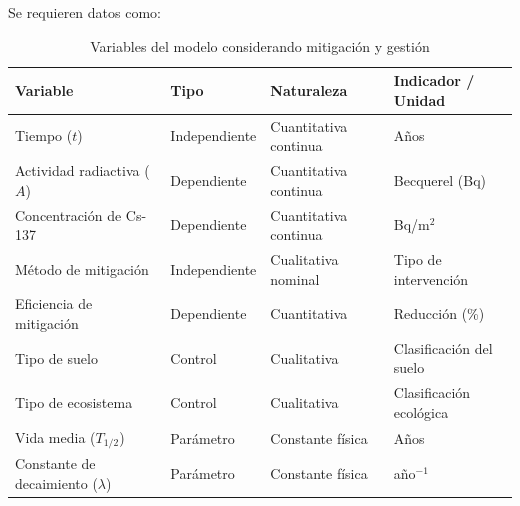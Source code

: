 

Se requieren datos como:

\begin{table}[!t]
\renewcommand{\arraystretch}{1.2}
\caption{Variables del modelo considerando mitigación y gestión}
\label{tab:variables}
\centering
\footnotesize
\begin{tabular}{|p{1.8cm}|p{1.6cm}|p{2.2cm}|p{2.6cm}|}
\hline
\textbf{Variable} & \textbf{Tipo} & \textbf{Naturaleza} & \textbf{Indicador / Unidad} \\
\hline

Tiempo ($t$) & Independiente & Cuantitativa continua & Años \\
\hline

Actividad radiactiva ($A$) & Dependiente & Cuantitativa continua & Becquerel (Bq) \\
\hline

Concentración de Cs-137 & Dependiente & Cuantitativa continua & Bq/m$^2$ \\
\hline

Método de mitigación & Independiente & Cualitativa nominal & Tipo de intervención \\
\hline

Eficiencia de mitigación & Dependiente & Cuantitativa & Reducción (\%) \\
\hline

Tipo de suelo & Control & Cualitativa & Clasificación del suelo \\
\hline

Tipo de ecosistema & Control & Cualitativa & Clasificación ecológica \\
\hline

Vida media ($T_{1/2}$) & Parámetro & Constante física & Años \\
\hline

Constante de decaimiento ($\lambda$) & Parámetro & Constante física & año$^{-1}$ \\
\hline

\end{tabular}
\end{table}

